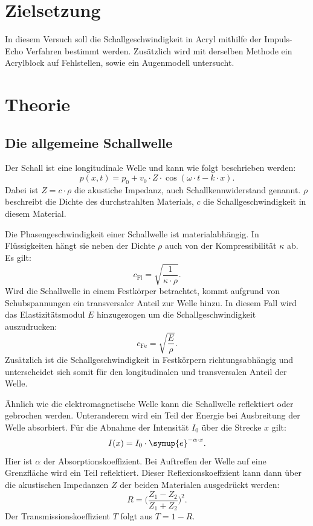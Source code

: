 \section{Zielsetzung}
\label{sec:Zielsetzung}
In diesem Versuch soll die Schallgeschwindigkeit in Acryl mithilfe der Impuls-Echo Verfahren bestimmt werden.
Zusätzlich wird mit derselben Methode ein Acrylblock auf Fehlstellen, sowie ein Augenmodell untersucht.

\section{Theorie}
\label{sec:Theorie}

\subsection{Die allgemeine Schallwelle}
\label{Schallwelle}

Der Schall ist eine longitudinale Welle und kann wie folgt beschrieben werden:
\begin{equation*}
    p(x, t) = p_0 + v_0 \cdot Z \cdot \cos(\omega \cdot t - k \cdot x).
\end{equation*}
Dabei ist $Z = c \cdot \rho$ die akustiche Impedanz, auch Schallkennwiderstand genannt.
$\rho$ beschreibt die Dichte des durchstrahlten Materials, $c$ die Schallgeschwindigkeit in diesem Material.

\noindent
Die Phasengeschwindigkeit einer Schallwelle ist materialabhängig.
In Flüssigkeiten hängt sie neben der Dichte $\rho$ auch von der Kompressibilität $\kappa$ ab.
Es gilt:
\begin{equation*}
    c_\text{Fl} = \sqrt{\frac{1}{\kappa \cdot \rho}}.
\end{equation*}
Wird die Schallwelle in einem Festkörper betrachtet, kommt aufgrund von Schubspannungen ein transversaler Anteil zur Welle hinzu.
In diesem Fall wird das Elastizitätsmodul $E$ hinzugezogen um die Schallgeschwindigkeit auszudrucken:
\begin{equation*}
    c_\text{Fe} = \sqrt{\frac{E}{\rho}}.
\end{equation*}
Zusätzlich ist die Schallgeschwindigkeit in Festkörpern richtungsabhängig und unterscheidet sich somit für den longitudinalen
und transversalen Anteil der Welle.

\noindent
Ähnlich wie die elektromagnetische Welle kann die Schallwelle reflektiert oder gebrochen werden.
Unteranderem wird ein Teil der Energie bei Ausbreitung der Welle absorbiert.
Für die Abnahme der Intensität $I_0$ über die Strecke $x$ gilt:
\begin{equation} \label{eqn:absorptionkoeff}
    I(x) = I_0 \cdot \symup{e}^{-\alpha \cdot x}.
\end{equation}
Hier ist $\alpha$ der Absorptionskoeffizient.
Bei Auftreffen der Welle auf eine Grenzfläche wird ein Teil reflektiert.
Dieser Reflexionskoeffzient kann dann über die akustischen Impedanzen $Z$ der beiden Materialen ausgedrückt werden:
\begin{equation*}
    R = \biggl(\frac{Z_1 - Z_2}{Z_1 + Z_2}\biggr)^2.
\end{equation*}
Der Transmissionskoeffizient $T$ folgt aus $T = 1 - R$.

